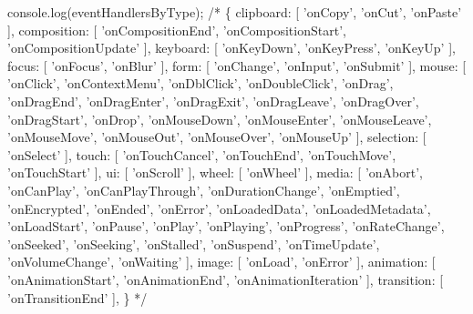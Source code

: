 \begin{DoxyCode}
console.log(eventHandlersByType);
/*
\{
  clipboard: [ 'onCopy', 'onCut', 'onPaste' ],
  composition: [ 'onCompositionEnd', 'onCompositionStart', 'onCompositionUpdate' ],
  keyboard: [ 'onKeyDown', 'onKeyPress', 'onKeyUp' ],
  focus: [ 'onFocus', 'onBlur' ],
  form: [ 'onChange', 'onInput', 'onSubmit' ],
  mouse: [ 'onClick', 'onContextMenu', 'onDblClick', 'onDoubleClick', 'onDrag', 'onDragEnd', 'onDragEnter',
       'onDragExit', 'onDragLeave', 'onDragOver', 'onDragStart', 'onDrop', 'onMouseDown', 'onMouseEnter',
       'onMouseLeave', 'onMouseMove', 'onMouseOut', 'onMouseOver', 'onMouseUp' ],
  selection: [ 'onSelect' ],
  touch: [ 'onTouchCancel', 'onTouchEnd', 'onTouchMove', 'onTouchStart' ],
  ui: [ 'onScroll' ],
  wheel: [ 'onWheel' ],
  media: [ 'onAbort', 'onCanPlay', 'onCanPlayThrough', 'onDurationChange', 'onEmptied', 'onEncrypted',
       'onEnded', 'onError', 'onLoadedData', 'onLoadedMetadata', 'onLoadStart', 'onPause', 'onPlay', 'onPlaying',
       'onProgress', 'onRateChange', 'onSeeked', 'onSeeking', 'onStalled', 'onSuspend', 'onTimeUpdate',
       'onVolumeChange', 'onWaiting' ],
  image: [ 'onLoad', 'onError' ],
  animation: [ 'onAnimationStart', 'onAnimationEnd', 'onAnimationIteration' ],
  transition: [ 'onTransitionEnd' ],
\}
*/
\end{DoxyCode}
 